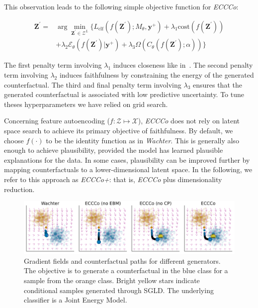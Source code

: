 This observation leads to the following simple objective function for \textit{ECCCo}:

\begin{equation} \label{eq:eccco}
  \begin{aligned}
  \mathbf{Z}^\prime =& \arg \min_{\mathbf{Z}^\prime \in \mathcal{Z}^L} \{  {L_{\text{clf}}(f(\mathbf{Z}^\prime);M_{\theta},\mathbf{y}^+)}+ \lambda_1 {\text{cost}(f(\mathbf{Z}^\prime)) } \\
  &+ \lambda_2 \mathcal{E}_{\theta}(f(\mathbf{Z}^\prime)|\mathbf{y}^+) + \lambda_3 \Omega(C_{\theta}(f(\mathbf{Z}^\prime);\alpha)) \} 
  \end{aligned} 
\end{equation}

The first penalty term involving $\lambda_1$ induces closeness like in~\citet{wachter2017counterfactual}. The second penalty term involving $\lambda_2$ induces faithfulness by constraining the energy of the generated counterfactual. The third and final penalty term involving $\lambda_3$ ensures that the generated counterfactual is associated with low predictive uncertainty. To tune theses hyperparameters we have relied on grid search.

Concerning feature autoencoding ($f: \mathcal{Z} \mapsto \mathcal{X}$), \textit{ECCCo} does not rely on latent space search to achieve its primary objective of faithfulness. By default, we choose $f(\cdot)$ to be the identity function as in \textit{Wachter}. This is generally also enough to achieve plausibility, provided the model has learned plausible explanations for the data. In some cases, plausibility can be improved further by mapping counterfactuals to a lower-dimensional latent space. In the following, we refer to this approach as \textit{ECCCo+}: that is, \textit{ECCCo} plus dimensionality reduction.

\begin{figure}
  \centering
  \includegraphics[width=0.75\linewidth]{../www/poc_gradient_fields.png}
  \caption{Gradient fields and counterfactual paths for different generators. The objective is to generate a counterfactual in the blue class for a sample from the orange class. Bright yellow stars indicate conditional samples generated through SGLD. The underlying classifier is a Joint Energy Model.}\label{fig:poc}
\end{figure}  

